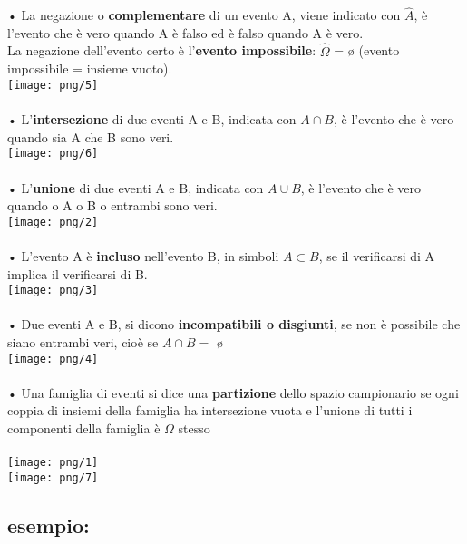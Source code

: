 \documentclass[12pt, letterpaper]{article}
\begin{document}
• La negazione o \textbf{complementare} di un evento A, viene indicato con $\hat{A}$, è l'evento che è vero quando A è falso
ed è falso quando A è vero.
\\
La negazione dell'evento certo è l'\textbf{evento impossibile}: $\hat{\Omega}$ = ø (evento impossibile = insieme vuoto).
\\
\texttt{[image: png/5]}
\\
\\
• L'\textbf{intersezione} di due eventi A e B, indicata con $A \cap B$, è l'evento che è vero quando sia A che B sono veri.
\\
\texttt{[image: png/6]}
\\
\\
• L'\textbf{unione} di due eventi A e B, indicata con $A \cup B$, è l'evento che è vero quando o A o B o entrambi sono veri.
\\
\texttt{[image: png/2]}
\\
\\
• L'evento A è \textbf{incluso} nell'evento B, in simboli $A \subset B$, se  il verificarsi di A implica il verificarsi di B.
\\
\texttt{[image: png/3]}
\\
\\
• Due eventi A e B, si dicono \textbf{incompatibili o disgiunti}, se non è possibile che siano entrambi veri, cioè se $A \cap B = $ ø
\\
\texttt{[image: png/4]}
\\
\\
• Una famiglia di eventi si dice una \textbf{partizione} dello spazio campionario
se ogni coppia di insiemi della famiglia ha intersezione vuota e
l’unione di tutti i componenti della famiglia è $\Omega$ stesso
\\
\\
\texttt{[image: png/1]}
\\
\texttt{[image: png/7]}
\\
\subsection{esempio:}
\end{document}
